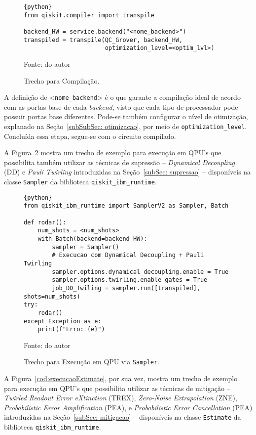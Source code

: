 \begin{figure}[!htb]
\centering
\caption{Trecho para Compilação.} 
\begin{lstlisting}{python}
from qiskit.compiler import transpile

backend_HW = service.backend("<nome_backend>")
transpiled = transpile(QC_Grover, backend_HW, 
                       optimization_level=<optim_lvl>)
\end{lstlisting}
{\small Fonte: do autor} 
\label{cod:compilacao} 
\end{figure}

A definição de <\texttt{nome\_backend}> é o que garante a compilação ideal de acordo com as portas base de cada \textit{backend}, visto que cada tipo de processador pode possuir portas base diferentes. Pode-se também configurar o nível de otimização, explanado na Seção~\ref{subSubSec: otimizacao}, por meio de \texttt{optimization\_level}. Concluída essa etapa, segue-se com o circuito compilado.

A Figura~\ref{cod:execucaoSampler} mostra um trecho de exemplo para execução em QPU's que possibilita também utilizar as técnicas de supressão -- \textit{Dynamical Decoupling} (DD) e \textit{Pauli Twirling} introduzidas na Seção~\ref{subSec: supressao} -- disponíveis na classe \texttt{Sampler} da biblioteca \texttt{qiskit\_ibm\_runtime}.

\begin{figure}[!htb]
\centering
\caption{Trecho para Execução em QPU via \texttt{Sampler}.} 
\begin{lstlisting}{python}
from qiskit_ibm_runtime import SamplerV2 as Sampler, Batch

def rodar():
    num_shots = <num_shots>
    with Batch(backend=backend_HW):
        sampler = Sampler()
        # Execucao com Dynamical Decoupling + Pauli Twirling
        sampler.options.dynamical_decoupling.enable = True
        sampler.options.twirling.enable_gates = True
        job_DD_Twiling = sampler.run([transpiled], shots=num_shots)
try:
    rodar()
except Exception as e:
    print(f"Erro: {e}")
\end{lstlisting}
{\small Fonte: do autor} 
\label{cod:execucaoSampler} 
\end{figure}

A Figura~\ref{cod:execucaoEstimate}, por sua vez, mostra um trecho de exemplo para execução em QPU's que possibilita utilizar as técnicas de mitigação -- \textit{Twirled Readout Error eXtinction} (TREX), \textit{Zero-Noise Extrapolation} (ZNE), \textit{Probabilistic Error Amplification} (PEA), e \textit{Probabilistic Error Cancellation} (PEA) introduzidas na Seção~\ref{subSec: mitigacao} -- disponíveis na classe \texttt{Estimate} da biblioteca \texttt{qiskit\_ibm\_runtime}.

